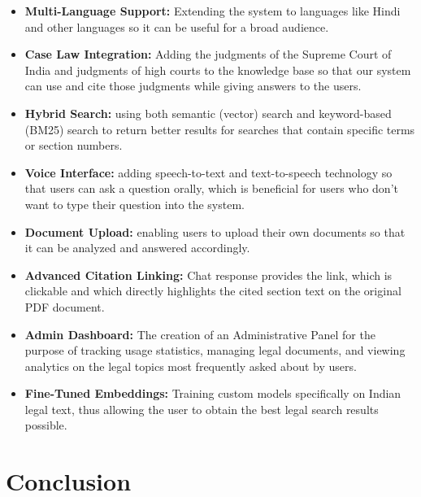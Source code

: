 \documentclass[12pt,a4paper]{article}
\begin{document}
\begin{itemize}
  \item \textbf{Multi-Language Support:} Extending the system to languages like Hindi and other languages so it can be useful for a broad audience.
  \item \textbf{Case Law Integration:} Adding the judgments of the Supreme Court of India and judgments of high courts to the knowledge base so that our system can use and cite those judgments while giving answers to the users.
  \item \textbf{Hybrid Search:} using both semantic (vector) search and keyword-based (BM25) search to return better results for searches that contain specific terms or section numbers.
  \item \textbf{Voice Interface:} adding speech-to-text and text-to-speech technology so that users can ask a question orally, which is beneficial for users who don’t want to type their question into the system.
  \item \textbf{Document Upload:} enabling users to upload their own documents so that it can be analyzed and answered accordingly.
  \item \textbf{Advanced Citation Linking:} Chat response provides the link, which is clickable and which directly highlights the cited section text on the original PDF document.


  \item \textbf{Admin Dashboard:} The creation of an Administrative Panel for the purpose of tracking usage statistics, managing legal documents, and viewing analytics on the legal topics most frequently asked about by users.
  \item \textbf{Fine-Tuned Embeddings:} Training custom models specifically on Indian legal text, thus allowing the user to obtain the best legal search results possible.
\end{itemize}

\section{Conclusion}

\end{document}
